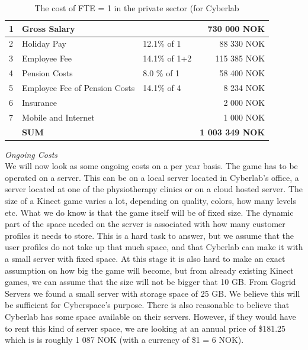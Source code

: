 \begin{table}
\centering
    \begin{tabular}{|l|l|l|r|}
        \hline
       1&Gross Salary & & 730 000 NOK \\ \hline
       2&Holiday Pay & 12.1\% of 1  & 88 330 NOK \\ \hline
	   3&Employee Fee & 14.1\% of 1+2  & 115 385 NOK \\ \hline
	   4&Pension Costs & 8.0 \% of 1 & 58 400 NOK\\ \hline
	   5&Employee Fee of Pension Costs & 14.1\% of 4 & 8 234 NOK \\ \hline
	   6&Insurance & & 2 000 NOK \\ \hline
	   7&Mobile and Internet & & 1 000 NOK \\ \hline
	   & \textbf{SUM} & & \textbf{1 003 349 NOK} \\
	    \hline
    \end{tabular}
    \caption[Cost of FTE = 1]{The cost of FTE = 1 in the private sector (for Cyberlab}
    \label{tab:costofFTE}
\end{table}
\emph{Ongoing Costs}\\
We will now look as some ongoing costs on a per year basis. The game has to be operated on a server. This can be on a local server located in Cyberlab’s office, a server located at one of the physiotherapy clinics or on a cloud hosted server. The size of a Kinect game varies a lot, depending on quality, colors, how many levels etc. What we do know is that the game itself will be of fixed size. The dynamic part of the space needed on the server is associated with how many customer profiles it needs to store. This is a hard task to answer, but we assume that the user profiles do not take up that much space, and that Cyberlab can make it with a small server with fixed space. At this stage it is also hard to make an exact assumption on how big the game will become, but from already existing Kinect games, we can assume that the size will not be bigger that 10 GB. From Gogrid Servers \cite{priceserver} we found a small server with storage space of 25 GB. We believe this will be sufficient for Cyberspace's purpose. There is also reasonable to believe that Cyberlab has some space available on their servers. However, if they would have to rent this kind of server space, we are looking at an annual price of \$181.25 which is is roughly 1 087 NOK (with a currency of \$1 = 6 NOK).\\ \\
